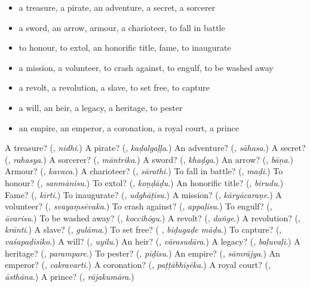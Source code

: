\begin{itemize}
\raggedright
  \item a treasure, a pirate, an adventure, a secret, a sorcerer
  \item a sword, an arrow, armour, a charioteer, to fall in battle
  \item to honour, to extol, an honorific title, fame, to inaugurate
  \item a mission, a volunteer, to crash against, to engulf, to be washed away
  \item a revolt, a revolution, a slave, to set free, to capture
  \item a will, an heir, a legacy, a heritage, to pester
  \item an empire, an emperor, a coronation, a royal court, a prince
\end{itemize}

\begin{tcolorbox}[breakable,colback=teal!4,colframe=teal!35!black,title={Before you move on}]
A treasure? (\textbf{}, \emph{nidhi}.) A pirate? (\textbf{}, \emph{kaḍalgaḷḷa}.) An adventure? (\textbf{}, \emph{sāhasa}.) A secret? (\textbf{}, \emph{rahasya}.) A sorcerer? (\textbf{}, \emph{māntrika}.) A sword? (\textbf{}, \emph{khaḍga}.) An arrow? (\textbf{}, \emph{bāṇa}.) Armour? (\textbf{}, \emph{kavaca}.) A charioteer? (\textbf{}, \emph{sārathi}.) To fall in battle? (\textbf{}, \emph{maḍi}.) To honour? (\textbf{}, \emph{sanmānisu}.) To extol? (\textbf{}, \emph{koṇḍāḍu}.) An honorific title? (\textbf{}, \emph{birudu}.) Fame? (\textbf{}, \emph{kīrti}.) To inaugurate? (\textbf{}, \emph{udghāṭisu}.) A mission? (\textbf{}, \emph{kāryācaraṇe}.) A volunteer? (\textbf{}, \emph{svayaṃsēvaka}.) To crash against? (\textbf{}, \emph{appaḷisu}.) To engulf? (\textbf{}, \emph{āvarisu}.) To be washed away? (\textbf{}, \emph{koccihōgu}.) A revolt? (\textbf{}, \emph{daṅge}.) A revolution? (\textbf{}, \emph{krānti}.) A slave? (\textbf{}, \emph{gulāma}.) To set free? (\textbf{ }, \emph{biḍugaḍe māḍu}.) To capture? (\textbf{}, \emph{vaśapaḍisiko}.) A will? (\textbf{}, \emph{uyilu}.) An heir? (\textbf{}, \emph{vārasudāra}.) A legacy? (\textbf{}, \emph{baḷuvaḷi}.) A heritage? (\textbf{}, \emph{parampare}.) To pester? (\textbf{}, \emph{pīḍisu}.) An empire? (\textbf{}, \emph{sāmrājya}.) An emperor? (\textbf{}, \emph{cakravarti}.) A coronation? (\textbf{}, \emph{paṭṭābhiṣēka}.) A royal court? (\textbf{}, \emph{āsthāna}.) A prince? (\textbf{}, \emph{rājakumāra}.)
\end{tcolorbox}
